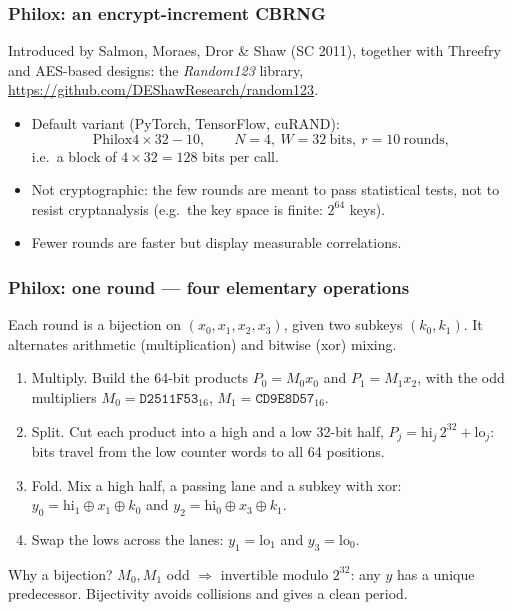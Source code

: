 \documentclass[aspectratio=169]{beamer}
\def\blue{\color{blue}}
\begin{document}
\begin{frame}
\frametitle{Philox: an encrypt-increment CBRNG}

Introduced by {\blue Salmon, Moraes, Dror \& Shaw} (SC 2011), together with
Threefry and AES-based designs: the \textsl{Random123} library,
\url{https://github.com/DEShawResearch/random123}.

\begin{itemize}
\item
{\blue Default variant} (PyTorch, TensorFlow, cuRAND):
\[
\text{Philox}4\times32{-}10, \qquad N = 4,\ W = 32 \ \text{bits},\ r = 10 \ \text{rounds},
\]
i.e.\ a block of $4 \times 32 = 128$ bits per call.
\item
{\blue Not cryptographic:} the few rounds are meant to pass statistical tests,
not to resist cryptanalysis (e.g.\ the key space is finite: $2^{64}$ keys).
\item
Fewer rounds are faster but display measurable correlations.
\end{itemize}

\end{frame}

\begin{frame}
\frametitle{Philox: one round --- four elementary operations}

Each round is a bijection on $(x_0, x_1, x_2, x_3)$, given two subkeys $(k_0, k_1)$.
It alternates {\blue arithmetic} (multiplication) and {\blue bitwise} (xor) mixing.

\begin{enumerate}
\item
{\blue Multiply.} Build the 64-bit products $P_0 = M_0 x_0$ and $P_1 = M_1 x_2$,
with the odd multipliers $M_0 = \mathtt{D2511F53}_{16}$,
$M_1 = \mathtt{CD9E8D57}_{16}$.
\item
{\blue Split.} Cut each product into a high and a low 32-bit half,
$P_j = \mathrm{hi}_j\, 2^{32} + \mathrm{lo}_j$: bits travel from the low counter
words to all 64 positions.
\item
{\blue Fold.} Mix a high half, a passing lane and a subkey with xor:
$y_0 = \mathrm{hi}_1 \oplus x_1 \oplus k_0$ and
$y_2 = \mathrm{hi}_0 \oplus x_3 \oplus k_1$.
\item
{\blue Swap the lows} across the lanes: $y_1 = \mathrm{lo}_1$ and $y_3 = \mathrm{lo}_0$.
\end{enumerate}

\vfill

{\blue Why a bijection?} $M_0, M_1$ odd $\Rightarrow$ invertible modulo $2^{32}$:
any $y$ has a unique predecessor. Bijectivity avoids collisions and gives a clean period.

\end{frame}
\end{document}

